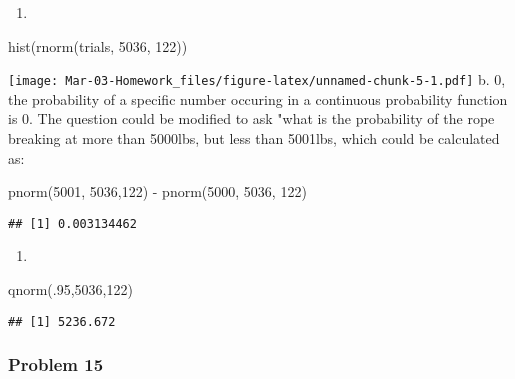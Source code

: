 \documentclass[
]{article}
\newenvironment{Shaded}{\begin{snugshade}}{\end{snugshade}}
\newcommand{\DecValTok}[1]{\textcolor[rgb]{0.00,0.00,0.81}{#1}}
\newcommand{\FunctionTok}[1]{\textcolor[rgb]{0.00,0.00,0.00}{#1}}
\newcommand{\NormalTok}[1]{#1}
\newcommand{\SpecialCharTok}[1]{\textcolor[rgb]{0.00,0.00,0.00}{#1}}
\providecommand{\tightlist}{%
  \setlength{\itemsep}{0pt}\setlength{\parskip}{0pt}}
\begin{document}
\begin{enumerate}
\def\labelenumi{\alph{enumi}.}
\tightlist
\item
\end{enumerate}

\begin{Shaded}
\begin{Highlighting}[]
\FunctionTok{hist}\NormalTok{(}\FunctionTok{rnorm}\NormalTok{(trials, }\DecValTok{5036}\NormalTok{, }\DecValTok{122}\NormalTok{))}
\end{Highlighting}
\end{Shaded}

\texttt{[image: Mar-03-Homework\_files/figure-latex/unnamed-chunk-5-1.pdf]}
b. 0, the probability of a specific number occuring in a continuous
probability function is 0. The question could be modified to ask "what
is the probability of the rope breaking at more than 5000lbs, but less
than 5001lbs, which could be calculated as:

\begin{Shaded}
\begin{Highlighting}[]
\FunctionTok{pnorm}\NormalTok{(}\DecValTok{5001}\NormalTok{, }\DecValTok{5036}\NormalTok{,}\DecValTok{122}\NormalTok{) }\SpecialCharTok{{-}} \FunctionTok{pnorm}\NormalTok{(}\DecValTok{5000}\NormalTok{, }\DecValTok{5036}\NormalTok{, }\DecValTok{122}\NormalTok{)}
\end{Highlighting}
\end{Shaded}

\begin{verbatim}
## [1] 0.003134462
\end{verbatim}

\begin{enumerate}
\def\labelenumi{\alph{enumi}.}
\setcounter{enumi}{2}
\tightlist
\item
\end{enumerate}

\begin{Shaded}
\begin{Highlighting}[]
\FunctionTok{qnorm}\NormalTok{(.}\DecValTok{95}\NormalTok{,}\DecValTok{5036}\NormalTok{,}\DecValTok{122}\NormalTok{)}
\end{Highlighting}
\end{Shaded}

\begin{verbatim}
## [1] 5236.672
\end{verbatim}

\hypertarget{problem-15}{%
\subsubsection{Problem 15}\label{problem-15}}
\end{document}

